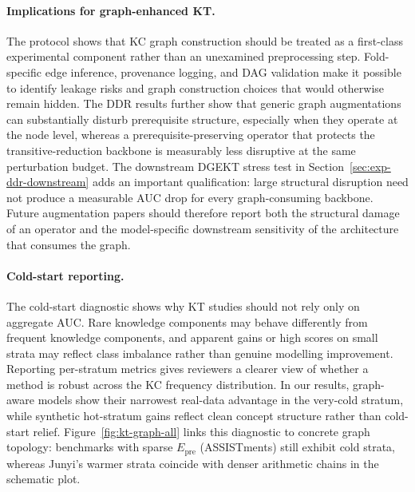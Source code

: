 \documentclass[pdflatex,sn-basic]{sn-jnl}
\newcommand{\Epre}{\ensuremath{E_{\text{pre}}}}
\newcommand{\KCs}{knowledge components}
\newcommand{\DDR}{\textsc{DDR}}
\begin{document}
\paragraph{Implications for graph-enhanced KT.}
The protocol shows that KC graph construction should be treated as a
first-class experimental component rather than an unexamined
preprocessing step. Fold-specific edge inference, provenance logging,
and DAG validation make it possible to identify leakage risks and graph
construction choices that would otherwise remain hidden. The \DDR{}
results further show that generic graph augmentations can substantially
disturb prerequisite structure, especially when they operate at the node
level, whereas a prerequisite-preserving operator that protects the
transitive-reduction backbone is measurably less disruptive at the same
perturbation budget. The downstream DGEKT stress test in
Section~\ref{sec:exp-ddr-downstream} adds an important qualification:
large structural disruption need not produce a measurable AUC drop for
every graph-consuming backbone. Future augmentation papers should
therefore report both the structural damage of an operator and the
model-specific downstream sensitivity of the architecture that consumes
the graph.
\paragraph{Cold-start reporting.}
The cold-start diagnostic shows why KT studies should not rely only on
aggregate AUC. Rare \KCs{} may behave differently from frequent
\KCs{}, and apparent gains or high scores on small strata may reflect
class imbalance rather than genuine modelling improvement. Reporting
per-stratum metrics gives reviewers a clearer view of whether a method
is robust across the KC frequency distribution. In our results,
graph-aware models show their narrowest real-data advantage in the
very-cold stratum, while synthetic hot-stratum gains reflect clean
concept structure rather than cold-start relief.
Figure~\ref{fig:kt-graph-all} links this diagnostic to concrete graph
topology: benchmarks with sparse $\Epre$ (ASSISTments) still exhibit
cold strata, whereas Junyi's warmer strata coincide with denser arithmetic
chains in the schematic plot.
\end{document}
